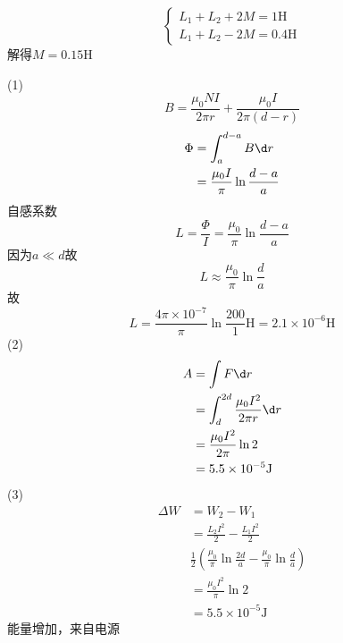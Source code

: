 \documentclass{phyasgn}
\begin{document}
\begin{sol}[3-34]
    $$\left\{\begin{matrix}
        L_1+L_2+2M=1\text{H}\\
       L_1+L_2-2M=0.4\text{H}
       \end{matrix}\right.$$
       解得$M=0.15\text{H}$
\end{sol}\par

\begin{sol}[3-35]
    (1)$$B=\frac{\mu_0NI}{2\pi r}+\frac{\mu_0I}{2\pi(d-r)}$$
    $$\begin{aligned}
        \Phi&=\int_{a}^{d-a}B\d r\\
        &=\frac{\mu_0I}{\pi}\ln\frac{d-a}{a}
    \end{aligned}$$
    自感系数$$L=\frac{\Phi}{I}=\frac{\mu_0}{\pi}\ln\frac{d-a}{a}$$
    因为$a\ll d$故
    $$L\approx \frac{\mu_0}{\pi}\ln\frac{d}{a}$$
    故$$L=\frac{4\pi \times 10^{-7}}{\pi}\ln\frac{200}{1}\text{H}=2.1\times10^{-6}\text{H}$$
    (2)$$\begin{aligned}
        A&=\int F\d r\\
        &=\int_{d}^{2d}\frac{\mu_0 I^2}{2\pi r}\d r\\
        &=\frac{\mu_0I^2}{2\pi}\ln2\\
        &=5.5\times10^{-5}\text{J}
    \end{aligned}$$
    (3)$$\begin{aligned}
        \Delta W&=W_2-W_1\\
        &=\frac{L_2I^2}{2}-\frac{L_1I^2}{2}\\
        &\frac{1}{2}(\frac{\mu_0}{\pi}\ln\frac{2d}{a}-\frac{\mu_0}{\pi}\ln\frac{d}{a})\\
        &=\frac{\mu_0I^2}{\pi}\ln2\\
        &=5.5\times10^{-5}\text{J}
    \end{aligned}$$
    能量增加，来自电源
\end{sol}\par
\end{document}

